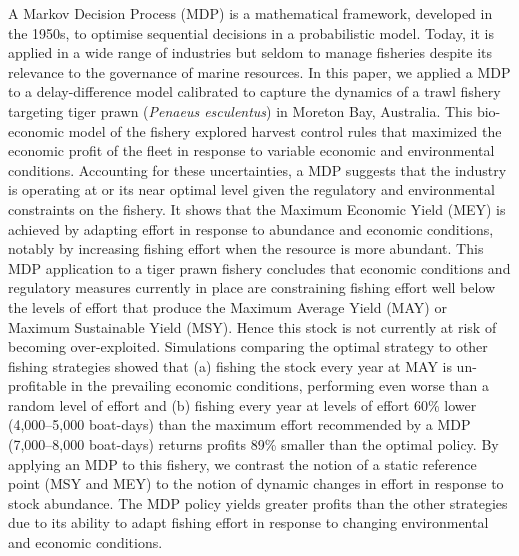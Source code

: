 A Markov Decision Process (MDP) is a mathematical framework, developed in the 1950s, to optimise sequential decisions in a probabilistic model. Today, it is applied in a wide range of industries but seldom to manage fisheries despite its relevance to the governance of marine resources. In this paper, we applied a MDP to a delay-difference model calibrated to capture the dynamics of a trawl fishery targeting tiger prawn ({\it Penaeus esculentus}) in Moreton Bay, Australia. This bio-economic model of the fishery explored harvest control rules that maximized the economic profit of the fleet in response to variable economic and environmental conditions. Accounting for these uncertainties, a MDP suggests that the industry is operating at or its near optimal level given the regulatory and environmental constraints on the fishery. It shows that the Maximum Economic Yield (MEY) is achieved by adapting effort in response to abundance and economic conditions, notably by increasing fishing effort when the resource is more abundant. This MDP application to a tiger prawn fishery concludes that economic conditions and regulatory measures currently in place are constraining fishing effort well below the levels of effort that produce the Maximum Average Yield (MAY) or Maximum Sustainable Yield (MSY). Hence this stock is not currently at risk of becoming over-exploited. Simulations comparing the optimal strategy to other fishing strategies showed that (a) fishing the stock every year at MAY is un-profitable in the prevailing economic conditions, performing even worse than a random level of effort and (b) fishing every year at levels of effort 60\% lower (4,000--5,000 boat-days) than the maximum effort recommended by a MDP (7,000--8,000 boat-days) returns profits 89\% smaller than the optimal policy. By applying an MDP to this fishery, we contrast the notion of a static reference point (MSY and MEY) to the notion of dynamic changes in effort in response to stock abundance. The MDP policy yields greater profits than the other strategies due to its ability to adapt fishing effort in response to changing environmental and economic conditions.